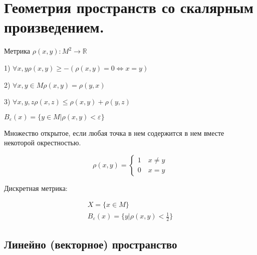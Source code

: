 \documentclass[12pt, a4paper]{report}
\begin{document}
\fi


\chapter{Геометрия пространств со скалярным произведением.}

\begin{definition}
    Метрика \( \rho (x,y): M ^2 \to  \mathbb{R} \) 

    1) \( \forall x,y \rho (x,y ) \geq - ( \rho(x,y) = 0 \Leftrightarrow x=y)   \) 

    2) \( \forall x,y \in  M \rho(x,y )= \rho (y,x)  \)
    
    3) \( \forall x,y,z \rho(x,z) \le  \rho(x,y)+\rho(y,z) \)
\end{definition}

\( B_{\varepsilon}(x) = \{ y \in  M | \rho(x,y) < \varepsilon \} \) 

\begin{definition}
    Множество открытое, если любая точка в нем содержится в нем вместе некоторой окрестностью.
\end{definition}

\[ 
\rho(x,y) = 
\begin{cases} 
    1 \quad x \neq y \\
    0 \quad  x=y   
\end{cases} 
\] 

Дискретная метрика: 

\begin{gather*}
    X= \{x \in  M \} \\
     B_{\varepsilon}(x) = \{ y  | \rho(x,y) < \frac{1}{2}  \}
\end{gather*}

\section{Линейно (векторное) пространство}
\end{document}

